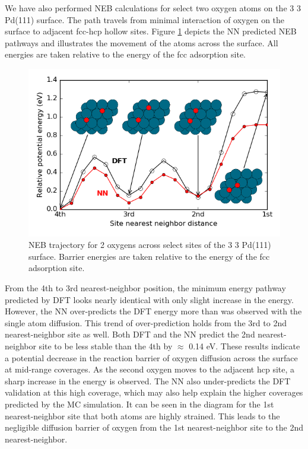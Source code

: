 \documentclass[12pt]{cmuthesis}
\begin{document}
We have also performed NEB calculations for select two oxygen atoms on the 3 \texttimes{} 3 Pd(111) surface. The path travels from minimal interaction of oxygen on the surface to adjacent fcc-hcp hollow sites. Figure \ref{fig-PdO2-NEB} depicts the NN predicted NEB pathways and illustrates the movement of the atoms across the surface.  All energies are taken relative to the energy of the fcc adsorption site.

\begin{figure}[htbp]
\centering
\includegraphics[width=5in]{./images/PdO2-NEB.png}
\caption{\label{fig-PdO2-NEB}
NEB trajectory for 2 oxygens across select sites of the 3 \texttimes{} 3 Pd(111) surface. Barrier energies are taken relative to the energy of the fcc adsorption site.}
\end{figure}

From the 4th to 3rd nearest-neighbor position, the minimum energy pathway predicted by DFT looks nearly identical with only slight increase in the energy. However, the NN over-predicts the DFT energy more than was observed with the single atom diffusion. This trend of over-prediction holds from the 3rd to 2nd nearest-neighbor site as well. Both DFT and the NN predict the 2nd nearest-neighbor site to be less stable than the 4th by \(\approx\) 0.14 eV. These results indicate a potential decrease in the reaction barrier of oxygen diffusion across the surface at mid-range coverages. As the second oxygen moves to the adjacent hcp site, a sharp increase in the energy is observed. The NN also under-predicts the DFT validation at this high coverage, which may also help explain the higher coverages predicted by the MC simulation. It can be seen in the diagram for the 1st nearest-neighbor site that both atoms are highly strained. This leads to the negligible diffusion barrier of oxygen from the 1st nearest-neighbor site to the 2nd nearest-neighbor.
\end{document}
